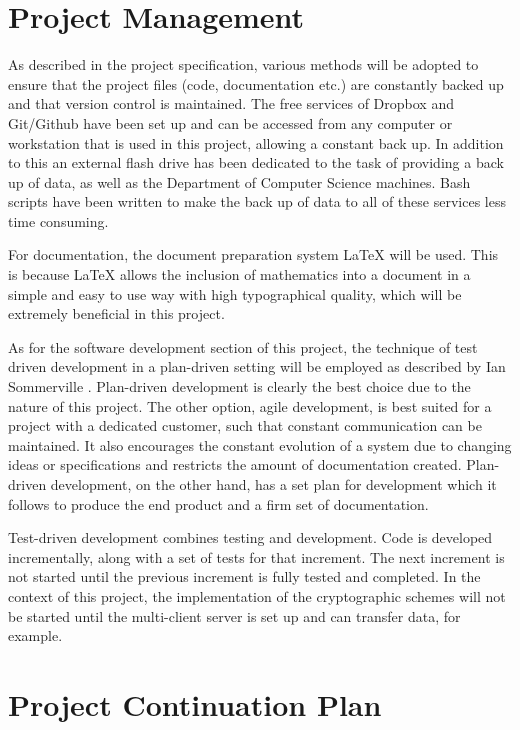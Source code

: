 \documentclass[a4paper,11pt]{article}
\begin{document}
\section{Project Management}

As described in the project specification, various methods will be adopted to ensure that the project files (code, documentation etc.) are constantly backed up and that version control is maintained. The free services of Dropbox\cite{dropbox} and Git/Github\cite{github} have been set up and can be accessed from any computer or workstation that is used in this project, allowing a constant back up. In addition to this an external flash drive has been dedicated to the task of providing a back up of data, as well as the Department of Computer Science machines. Bash scripts have been written to make the back up of data to all of these services less time consuming.

For documentation, the document preparation system LaTeX will be used. This is because LaTeX allows the inclusion of mathematics into a document in a simple and easy to use way with high typographical quality, which will be extremely beneficial in this project. 

As for the software development section of this project, the technique of test driven development in a plan-driven setting will be employed as described by Ian Sommerville \cite{iansommerville}. Plan-driven development is clearly the best choice due to the nature of this project. The other option, agile development, is best suited for a project with a dedicated customer, such that constant communication can be maintained. It also encourages the constant evolution of a system due to changing ideas or specifications and restricts the amount of documentation created. Plan-driven development, on the other hand, has a set plan for development which it follows to produce the end product and a firm set of documentation. 

Test-driven development combines testing and development. Code is developed incrementally, along with a set of tests for that increment. The next increment is not started until the previous increment is fully tested and completed. In the context of this project, the implementation of the cryptographic schemes will not be started until the multi-client server is set up and can transfer data, for example. 

\section{Project Continuation Plan}
\end{document}
